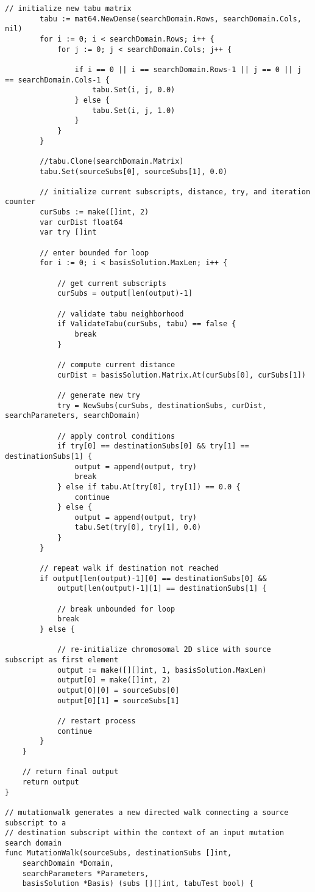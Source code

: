 \begin{lstlisting}[basicstyle=\tiny]
		// initialize new tabu matrix
		tabu := mat64.NewDense(searchDomain.Rows, searchDomain.Cols, nil)
		for i := 0; i < searchDomain.Rows; i++ {
			for j := 0; j < searchDomain.Cols; j++ {

				if i == 0 || i == searchDomain.Rows-1 || j == 0 || j == searchDomain.Cols-1 {
					tabu.Set(i, j, 0.0)
				} else {
					tabu.Set(i, j, 1.0)
				}
			}
		}

		//tabu.Clone(searchDomain.Matrix)
		tabu.Set(sourceSubs[0], sourceSubs[1], 0.0)

		// initialize current subscripts, distance, try, and iteration counter
		curSubs := make([]int, 2)
		var curDist float64
		var try []int

		// enter bounded for loop
		for i := 0; i < basisSolution.MaxLen; i++ {

			// get current subscripts
			curSubs = output[len(output)-1]

			// validate tabu neighborhood
			if ValidateTabu(curSubs, tabu) == false {
				break
			}

			// compute current distance
			curDist = basisSolution.Matrix.At(curSubs[0], curSubs[1])

			// generate new try
			try = NewSubs(curSubs, destinationSubs, curDist, searchParameters, searchDomain)

			// apply control conditions
			if try[0] == destinationSubs[0] && try[1] == destinationSubs[1] {
				output = append(output, try)
				break
			} else if tabu.At(try[0], try[1]) == 0.0 {
				continue
			} else {
				output = append(output, try)
				tabu.Set(try[0], try[1], 0.0)
			}
		}

		// repeat walk if destination not reached
		if output[len(output)-1][0] == destinationSubs[0] && 
		    output[len(output)-1][1] == destinationSubs[1] {

			// break unbounded for loop
			break
		} else {

			// re-initialize chromosomal 2D slice with source subscript as first element
			output := make([][]int, 1, basisSolution.MaxLen)
			output[0] = make([]int, 2)
			output[0][0] = sourceSubs[0]
			output[0][1] = sourceSubs[1]

			// restart process
			continue
		}
	}

	// return final output
	return output
}

// mutationwalk generates a new directed walk connecting a source subscript to a
// destination subscript within the context of an input mutation search domain
func MutationWalk(sourceSubs, destinationSubs []int, 
    searchDomain *Domain, 
    searchParameters *Parameters, 
    basisSolution *Basis) (subs [][]int, tabuTest bool) {


\end{lstlisting}

